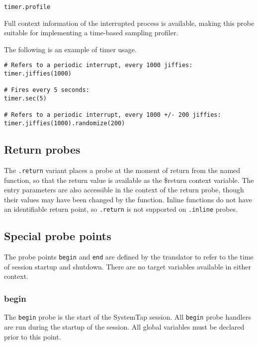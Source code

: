 \documentclass[twoside,english]{article}
\newenvironment{vindent}
{\begin{list}{}{\setlength{\listparindent}{6pt}}
\item[]}
{\end{list}}
\begin{document}
\begin{vindent}
\begin{verbatim}
timer.profile
\end{verbatim}
\end{vindent}
Full context information of the interrupted process is available, making
this probe suitable for implementing a time-based sampling profiler.

The following is an example of timer usage.

\begin{vindent}
\begin{verbatim}
# Refers to a periodic interrupt, every 1000 jiffies:
timer.jiffies(1000)

# Fires every 5 seconds:
timer.sec(5)

# Refers to a periodic interrupt, every 1000 +/- 200 jiffies:
timer.jiffies(1000).randomize(200)
\end{verbatim}
\end{vindent}

\subsection{Return probes}
The \texttt{.return} variant places a probe at the moment of return from
the named function, so that the return value is available as the \$return
context variable. The entry parameters are also accessible in the context
of the return probe, though their values may have been changed by the function.
Inline functions do not have an identifiable return point, so \texttt{.return}
is not supported on \texttt{.inline} probes.


\subsection{Special probe points}

The probe points \texttt{begin} and \texttt{end} are defined by the translator
to refer to the time of session startup and shutdown. There are no target
variables available in either context.


\subsubsection{begin}
The \texttt{begin} probe is the start of the SystemTap session. All \texttt{begin}
probe handlers are run during the startup of the session. All global variables
must be declared prior to this point.
\end{document}
